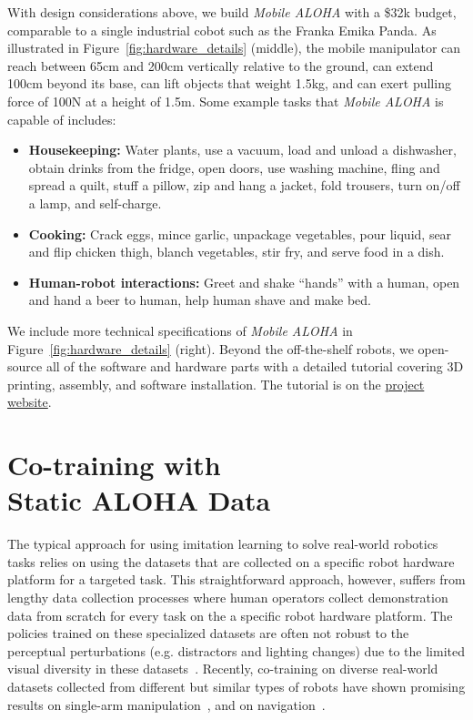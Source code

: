 \documentclass[11pt, a4paper, logo, twocolumn]{stanford}
\newcommand{\method}{\textit{Mobile ALOHA} }
\begin{document}
With design considerations above, we build \method with a \$32k budget, comparable to a single industrial cobot such as the Franka Emika Panda. 
As illustrated in Figure~\ref{fig:hardware_details} (middle), the mobile manipulator can reach between 65cm and 200cm vertically relative to the ground, can extend 100cm beyond its base, can lift objects that weight 1.5kg, and can exert pulling force of 100N at a height of 1.5m.
Some example tasks that \method is capable of includes:

\begin{itemize}[leftmargin=*]
    \item \textbf{Housekeeping:} Water plants, use a vacuum, load and unload a dishwasher, obtain drinks from the fridge, open doors, use washing machine, fling and spread a quilt, stuff a pillow, zip and hang a jacket, fold trousers, turn on/off a lamp, and self-charge.
    \item \textbf{Cooking:} Crack eggs, mince garlic, unpackage vegetables, pour liquid, sear and flip chicken thigh, blanch vegetables, stir fry, and serve food in a dish.
    \item \textbf{Human-robot interactions:} Greet and shake ``hands'' with a human, open and hand a beer to human, help human shave and make bed. 
\end{itemize}

We include more technical specifications of \method in Figure~\ref{fig:hardware_details} (right).
Beyond the off-the-shelf robots, we open-source all of the software and hardware parts with a detailed tutorial covering 3D printing, assembly, and software installation. The tutorial is on the \href{https://mobile-aloha.github.io/}{project website}.







\section{Co-training with\\Static ALOHA Data}

The typical approach for using imitation learning to solve real-world robotics tasks relies on using the datasets that are collected on a specific robot hardware platform for a targeted task. This straightforward approach, however, suffers from lengthy data collection processes where human operators collect demonstration data from scratch for every task on the a
specific robot hardware platform. The policies trained on these specialized datasets are often not robust to the perceptual perturbations (e.g. distractors and lighting changes) due to the limited visual diversity in these datasets~\cite{xie2023decomposing}.
Recently, co-training on diverse real-world datasets collected from different but similar types of robots have shown promising results on single-arm manipulation~\cite{open_x_embodiment_rt_x_2023,octo_2023,bousmalis2023robocat,fang2023rh20t}, and on navigation~\cite{shah2023gnm}. 
\end{document}
